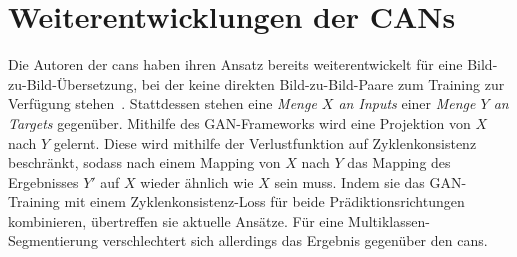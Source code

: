 \section{Weiterentwicklungen der CANs}

Die Autoren der \glspl{can} haben ihren Ansatz bereits weiterentwickelt für eine Bild-zu-Bild-Übersetzung, bei der keine direkten Bild-zu-Bild-Paare zum Training zur Verfügung stehen~\cite{Zhu.2018}.
Stattdessen stehen eine \emph{Menge $ X $ an Inputs} einer \emph{Menge $ Y $ an Targets} gegenüber.
Mithilfe des GAN-Frameworks wird eine Projektion von $ X $ nach $ Y $ gelernt.
Diese wird mithilfe der Verlustfunktion auf Zyklenkonsistenz beschränkt, sodass nach einem Mapping von $ X $ nach $ Y $ das Mapping des Ergebnisses $ Y' $ auf $ X $ wieder ähnlich wie $ X $ sein muss.
Indem sie das GAN-Training mit einem Zyklenkonsistenz-Loss für beide Prädiktionsrichtungen kombinieren, übertreffen sie aktuelle Ansätze.
Für eine Multiklassen-Segmentierung verschlechtert sich allerdings das Ergebnis gegenüber den \glspl{can}.
